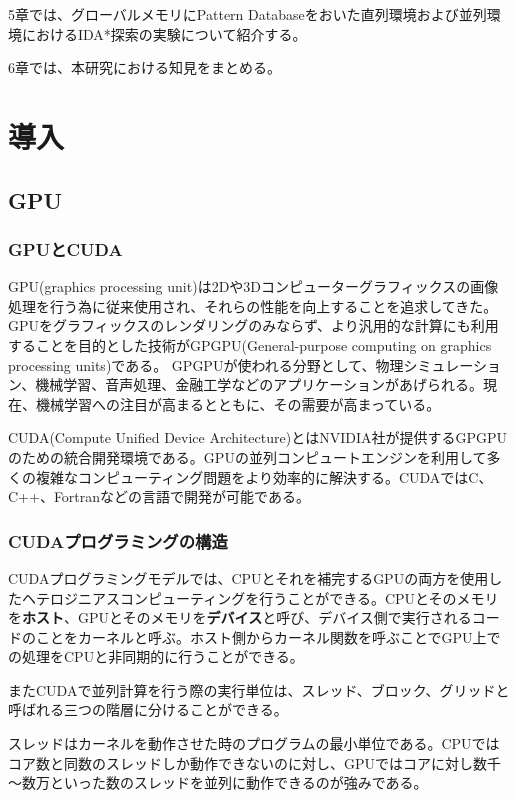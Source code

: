 \documentclass[a4paper,11pt,oneside,openany]{jsbook}
\begin{document}
5章では、グローバルメモリにPattern Databaseをおいた直列環境および並列環境におけるIDA*探索の実験について紹介する。

6章では、本研究における知見をまとめる。

\chapter{導入}
\section{GPU}
\subsection{GPUとCUDA}
GPU(graphics processing unit)は2Dや3Dコンピューターグラフィックスの画像処理を行う為に従来使用され、それらの性能を向上することを追求してきた。
GPUをグラフィックスのレンダリングのみならず、より汎用的な計算にも利用することを目的とした技術がGPGPU(General-purpose computing on graphics processing units)である。
GPGPUが使われる分野として、物理シミュレーション、機械学習、音声処理、金融工学などのアプリケーションがあげられる。現在、機械学習への注目が高まるとともに、その需要が高まっている。

CUDA(Compute Unified Device Architecture)とはNVIDIA社が提供するGPGPUのための統合開発環境である。GPUの並列コンピュートエンジンを利用して多くの複雑なコンピューティング問題をより効率的に解決する。CUDAではC、C++、Fortranなどの言語で開発が可能である。

\subsection{CUDAプログラミングの構造}
CUDAプログラミングモデルでは、CPUとそれを補完するGPUの両方を使用したヘテロジニアスコンピューティングを行うことができる。CPUとそのメモリを{\bf ホスト}、GPUとそのメモリを{\bf デバイス}と呼び、デバイス側で実行されるコードのことをカーネルと呼ぶ。ホスト側からカーネル関数を呼ぶことでGPU上での処理をCPUと非同期的に行うことができる。

またCUDAで並列計算を行う際の実行単位は、スレッド、ブロック、グリッドと呼ばれる三つの階層に分けることができる。

スレッドはカーネルを動作させた時のプログラムの最小単位である。CPUではコア数と同数のスレッドしか動作できないのに対し、GPUではコアに対し数千～数万といった数のスレッドを並列に動作できるのが強みである。
\end{document}
